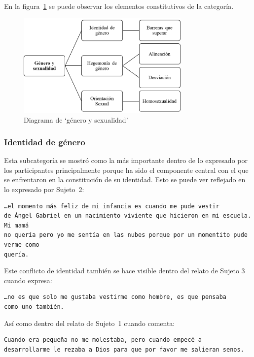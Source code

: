En la figura~\ref{fig:genero} se puede observar los elementos constitutivos de
la categoría.

\begin{figure}
    \centering
    \includegraphics[width=0.75\textwidth]{genero}
    \caption{Diagrama de ‘género y sexualidad’}\label{fig:genero}
\end{figure}

\subsubsection{Identidad de género}

Esta subcategoría se mostró como la más importante dentro de lo expresado por
los participantes principalmente porque ha sido el componente central con
el que se enfrentaron en la constitución de su identidad. Esto se puede ver
reflejado en lo expresado por Sujeto~2:

\begin{verbatim}
…el momento más feliz de mi infancia es cuando me pude vestir
de Ángel Gabriel en un nacimiento viviente que hicieron en mi escuela. Mi mamá
no quería pero yo me sentía en las nubes porque por un momentito pude verme como
quería.
\end{verbatim}

Este conflicto de identidad también se hace visible dentro del relato de Sujeto
3 cuando expresa:

\begin{verbatim}
…no es que solo me gustaba vestirme como hombre, es que pensaba
como uno también.
\end{verbatim}

Así como dentro del relato de Sujeto~1 cuando comenta:

\begin{verbatim}
Cuando era pequeña no me molestaba, pero cuando empecé a
desarrollarme le rezaba a Dios para que por favor me salieran senos.
\end{verbatim}

